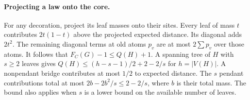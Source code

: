 \documentclass[11pt,a4paper]{article}
\begin{document}
\paragraph{Projecting a law onto the core.}
For any decoration, project its leaf masses onto their sites. Every leaf of mass $t$ contributes $2t(1-t)$ above the projected expected distance. Its diagonal adds $2t^2$. The remaining diagonal terms at old atoms $p_v$ are at most $2\sum p_v$ over those atoms. It follows that $F_C(G)-1\le Q(H)+1$. A spanning tree of $H$ with $s\ge2$ leaves gives $Q(H)\le(h-s-1)/2+2-2/s$ for $h=|V(H)|$. A nonpendant bridge contributes at most $1/2$ to expected distance. The $s$ pendant contributions total at most $2b-2b^2/s\le2-2/s$, where $b$ is their total mass. The bound also applies when $s$ is a lower bound on the available number of leaves.
\end{document}
